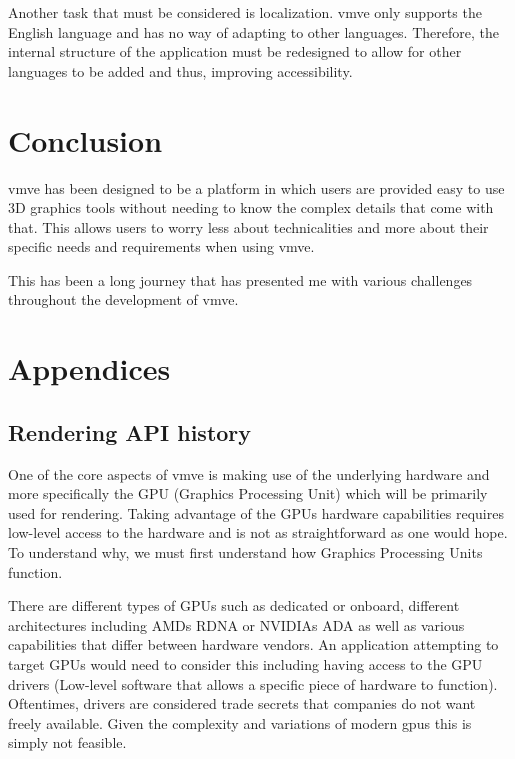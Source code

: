 \documentclass[11pt]{article}
\begin{document}
Another task that must be considered is localization. \gls{vmve} only supports
the English language and has no way of adapting to other languages. Therefore,
the internal structure of the application must be redesigned to allow for
other languages to be added and thus, improving accessibility.

\section{Conclusion}

\gls{vmve} has been designed to be a platform in which users are provided easy to use
3D graphics tools without needing to know the complex details that come with
that. This allows users to worry less about technicalities and more about their
specific needs and requirements when using \gls{vmve}.

This has been a long journey that has presented me with various challenges
throughout the development of \gls{vmve}.


\clearpage
\printnoidxglossary

\clearpage
\printnoidxglossary[type=\acronymtype]

\clearpage




\section{Appendices}

\subsection{Rendering API history} \label{rendering_api_appendix}
One of the core aspects of \gls{vmve} is making use of the underlying hardware and
more specifically the GPU (Graphics Processing Unit) which will be primarily
used for rendering. Taking advantage of the GPUs hardware capabilities requires
low-level access to the hardware and is not as straightforward as one would
hope. To understand why, we must first understand how Graphics Processing Units
function.

There are different types of GPUs such as dedicated or onboard, different
architectures including AMDs RDNA \cite{RDNA} or NVIDIAs ADA \cite{ADA} as well
as various capabilities that differ between hardware vendors. An application
attempting to target GPUs would need to consider this including having access to
the GPU drivers (Low-level software that allows a specific piece of hardware to
function). Oftentimes, drivers are considered trade secrets that companies do
not want freely available. Given the complexity and variations of modern
\glspl{gpu} this is simply not feasible.
\end{document}
